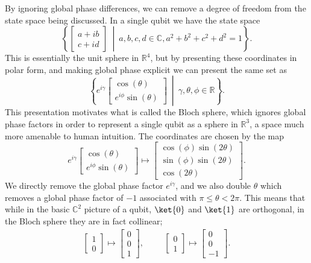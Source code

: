 By ignoring global phase differences, we can remove a degree of freedom from the state space being discussed. In a single qubit we have the state space
\[\left\{\begin{bmatrix}a+ib \\ c+id\end{bmatrix}\ \middle|\ a, b, c, d \in \mathbb{C}, a^2+b^2+c^2+d^2 = 1\right\}.\]
This is essentially the unit sphere in $\mathbb{R}^4$, but by presenting these coordinates in polar form, and making global phase explicit we can present the same set as
\[\left\{e^{i\gamma}\begin{bmatrix}\cos(\theta) \\ e^{i\phi}\sin(\theta)\end{bmatrix}\ \middle|\ \gamma, \theta, \phi \in \mathbb{R}\right\}.\]
This presentation motivates what is called the Bloch sphere, which ignores global phase factors in order to represent a single qubit as a sphere in $\mathbb{R}^3$, a space much more amenable to human intuition. The coordinates are chosen by the map
\[e^{i\gamma}\begin{bmatrix}\cos(\theta) \\ e^{i\phi}\sin(\theta)\end{bmatrix} \mapsto
\begin{bmatrix}\cos(\phi)\sin(2\theta) \\ \sin(\phi)\sin(2\theta) \\ \cos(2\theta)\end{bmatrix}.\]
We directly remove the global phase factor $e^{i\gamma}$, and we also double $\theta$ which removes a global phase factor of $-1$ associated with $\pi \leq \theta < 2\pi$. This means that while in the basic $\mathbb{C}^2$ picture of a qubit, $\ket{0}$ and $\ket{1}$ are orthogonal, in the Bloch sphere they are in fact collinear;
\begin{align*}
\begin{bmatrix}1 \\ 0\end{bmatrix} \mapsto \begin{bmatrix}0\\0\\1\end{bmatrix},
&&&
\begin{bmatrix}0 \\ 1\end{bmatrix} \mapsto \begin{bmatrix}0\\0\\-1\end{bmatrix}.
\end{align*}

